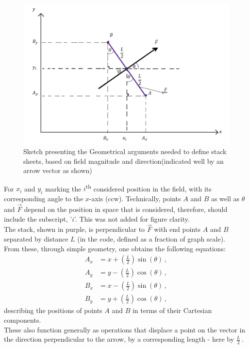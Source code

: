 \documentclass[12pt]{report}
\begin{document}
\begin{figure}[H]
	\centering
	\includegraphics[scale=0.4]{Documentation_images/Geometry of 1 stack sheet}
	\caption{Sketch presenting the Geometrical arguments needed to define stack sheets, based on field magnitude and direction(indicated well by an arrow vector as shown)}
	\label{fig:1 sheet}
\end{figure}
\noindent For \( x_i\) and \( y_i\) marking the $i$\textsuperscript{th}  considered position in the field, with its corresponding angle to the $x$-axis (ccw). Technically, points \(A\) and \(B\) as well as $\theta$ and $\vec F$ depend on the position in space that is considered, therefore, should include the subscript, '\(i \)'. This was not added for figure clarity. \\
The stack, shown in purple, is perpendicular to $\vec F$  with end points $A$ and $B$ separated by distance $L$ (in the code, defined as a fraction of graph scale).\\
From these, through simple geometry, one obtains the following equations:
\begin{equation}
\label{T1} \begin{split}
A_x &= x + \left( \frac{L}{2} \right) \sin( \theta)\,,\\
A_y &= y - \left( \frac{L}{2} \right) \cos( \theta)\,,\\
B_x &= x - \left( \frac{L}{2} \right) \sin( \theta)\,,\\
B_y &= y + \left( \frac{L}{2} \right) \cos( \theta)\,,
\end{split}
\end{equation}
describing the positions of points \(A\) and \(B\) in terms of their Cartesian components.\\
These also function generally as operations that displace a point on the vector in the direction perpendicular to the arrow, by a corresponding length - here by \( \frac{L}{2} \)\,. \\
\end{document}
